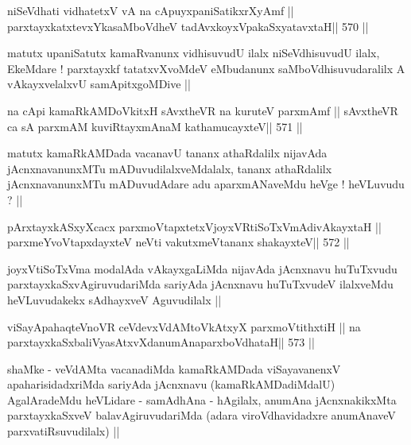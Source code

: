 \begin{shl}
niSeVdhati vidhatetxV vA na cApuyxpaniSatikxrXyAmf ||
parxtayxkatxtevxYkasaMboVdheV tadAvxkoyxVpakaSxyatavxtaH\hfill || 570 ||
\end{shl}

\begin{artha}
matutx upaniSatutx kamaRvanunx vidhisuvudU ilalx niSeVdhisuvudU ilalx,
EkeMdare ! parxtayxkf tatatxvXvoMdeV eMbudanunx saMboVdhisuvudaralilx
A vAkayxvelalxvU samApitxgoMDive ||
\end{artha}

\begin{shl}
na cApi kamaRkAMDoVkitxH sAvxtheVR na kuruteV parxmAmf ||
sAvxtheVR ca sA parxmAM kuviRtayxmAnaM kathamucayxteV\hfill || 571 ||
\end{shl}

\begin{artha}
matutx kamaRkAMDada vacanavU tananx athaRdalilx nijavAda
jAcnxnavanunxMTu mADuvudilalxveMdalalx, tananx athaRdalilx
jAcnxnavanunxMTu mADuvudAdare adu aparxmANaveMdu heVge ! heVLuvudu ? ||
\end{artha}

\begin{shl}
pArxtayxkASxyXcacx parxmoVtapxtetxVjoyxVRtiSoTxVmAdivAkayxtaH ||
parxmeYvoVtapxdayxteV neVti vakutxmeVtananx shakayxteV\hfill || 572 ||
\end{shl}

\begin{artha}
joyxVtiSoTxVma modalAda vAkayxgaLiMda nijavAda jAcnxnavu huTuTxvudu
parxtayxkaSxvAgiruvudariMda sariyAda jAcnxnavu huTuTxvudeV ilalxveMdu
heVLuvudakekx sAdhayxveV Aguvudilalx ||
\end{artha}

\begin{shl}
viSayApahaqteVnoVR ceVdevxVdAMtoVkAtxyX parxmoVtithxtiH ||
na parxtayxkaSxbaliVyasAtxvXdanumAnaparxboVdhataH\hfill || 573 ||
\end{shl}

\begin{artha}
shaMke - veVdAMta vacanadiMda kamaRkAMDada viSayavanenxV
apaharisidadxriMda sariyAda jAcnxnavu (kamaRkAMDadiMdalU) AgalAradeMdu
heVLidare - samAdhAna - hAgilalx, anumAna jAcnxnakikxMta
parxtayxkaSxveV balavAgiruvudariMda (adara viroVdhavidadxre anumAnaveV
parxvatiRsuvudilalx) ||
\end{artha}
